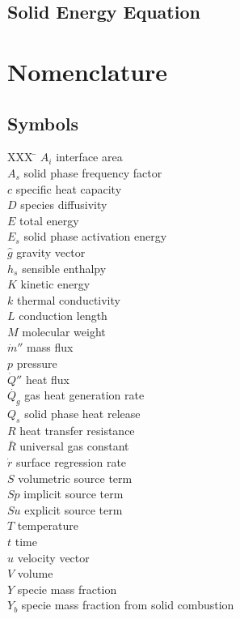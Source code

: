 \documentclass{article}
\renewcommand{\vec}[1]{\ensuremath{\hat{#1}}}
\begin{document}
    \subsection{Solid Energy Equation}

  \section*{Nomenclature}
    \begin{multicols}{2}
      \subsection*{Symbols}
        \begin{tabbing}
          XXX \= \kill
          $A_i$ \> interface area \\
          $A_s$ \> solid phase frequency factor \\
          $c$ \>  specific heat capacity \\
          $D$ \> species diffusivity \\
          $E$ \> total energy \\
          $E_s$ \> solid phase activation energy \\
          $\vec{g}$ \> gravity vector \\
          $h_s$ \> sensible enthalpy \\
          $K$ \> kinetic energy \\
          $k$ \> thermal conductivity \\
          $L$ \> conduction length \\
          $M$ \> molecular weight \\
          $\dot{m}''$ \> mass flux \\
          $p$ \> pressure \\
          $\dot{Q}''$ \> heat flux \\
          $\dot{Q_g}$ \> gas heat generation rate \\
          $Q_s$ \> solid phase heat release \\
          $R$ \> heat transfer resistance \\
          $\bar{R}$ \> universal gas constant \\
          $\dot{r}$ \> surface regression rate \\
          $S$ \> volumetric source term \\
          $Sp$ \> implicit source term \\
          $Su$ \> explicit source term \\
          $T$ \> temperature \\
          $t$ \> time \\
          $\vec{u}$ \> velocity vector \\
          $V$ \> volume \\
          $Y$ \> specie mass fraction \\
          $Y_b$ \> specie mass fraction from solid combustion
        \end{tabbing}

\end{multicols}
\end{document}
